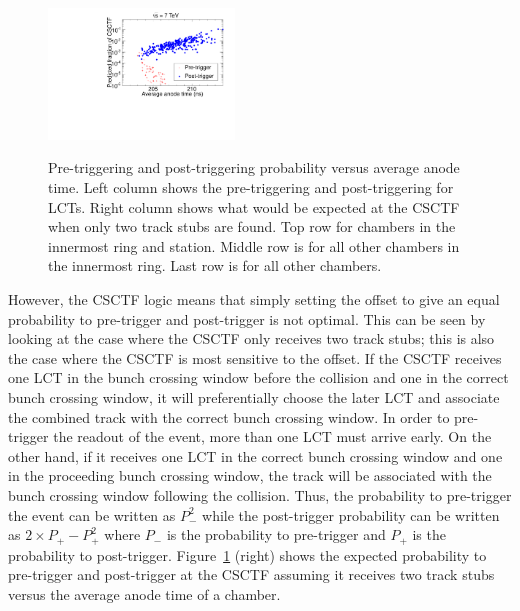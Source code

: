 \begin{figure}
\begin{center}
      \includegraphics[clip=true, trim=0.0cm 0cm 0.0cm 0cm, width=0.44\textwidth]{figures/timing/Ring2_Anode_vs_TF_all} \\
      \caption[CSC pre-triggering and post-triggering versus average anode time for LCTs and expected behavior at CSCTF]
      {Pre-triggering and post-triggering probability versus average anode time. Left column shows the pre-triggering and post-triggering for LCTs.
Right column shows what would be expected at the CSCTF when only two track stubs are found.
Top row for chambers in the innermost ring and station. Middle row is for all other chambers in the innermost ring.
Last row is for all other chambers.
        }
      \label{fig:AnodevsprePost}
  \end{center}
\end{figure}

However, the CSCTF logic means that simply setting the offset to give an equal probability to pre-trigger and post-trigger is not optimal. This can be seen by looking at
the case where the CSCTF only receives two track stubs; this is also the case where the CSCTF is most sensitive to the offset. If the CSCTF receives one LCT in the bunch
crossing window before the collision and one in the correct bunch crossing window, it will preferentially choose the later LCT and associate the combined track with the correct
bunch crossing window.  In order to pre-trigger the readout of the event, more than one LCT must arrive early.
On the other hand, if it receives one LCT in the correct bunch crossing window and one in the proceeding bunch crossing window, the track will be associated with the
bunch crossing window following the collision. Thus, the probability to pre-trigger the event can be written as $P_{-}^2$ while the post-trigger probability can be written as
$2 \times P_{+} - P_{+}^2$ where $P_{-}$ is the probability to pre-trigger and $P_{+}$ is the probability to post-trigger.
Figure~\ref{fig:AnodevsprePost} (right) shows the expected probability to pre-trigger and post-trigger at the CSCTF assuming it receives two track stubs versus
the average anode time of a chamber.

